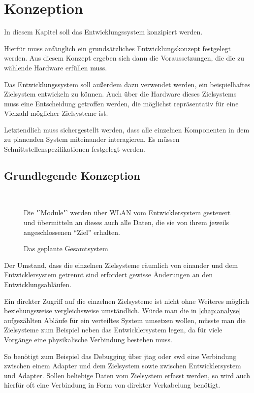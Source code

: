 \chapter{Konzeption}
\minitoc
In diesem Kapitel soll das Entwicklungssystem konzipiert werden.

Hierfür muss anfänglich ein grundsätzliches Entwicklungskonzept festgelegt
werden. Aus diesem Konzept ergeben sich dann die Voraussetzungen, die die zu
wählende Hardware erfüllen muss.

Das Entwicklungssystem soll außerdem dazu verwendet werden, ein
beispielhaftes Zielsystem entwickeln zu können. Auch über die Hardware dieses
Zielsystems muss eine Entscheidung getroffen werden, die möglichst
repräsentativ für eine Vielzahl möglicher Zielsysteme ist.

Letztendlich muss sichergestellt werden, dass alle einzelnen Komponenten in dem
zu planenden System miteinander interagieren. Es müssen
Schnittstellenspezifikationen festgelegt werden.
\section{Grundlegende Konzeption}
\begin{figure}[!ht]
\centering
\def\svgwidth{0.88\columnwidth}
\\
\caption{Das geplante Gesamtsystem}{Die "'Module"' werden über WLAN
vom Entwicklersystem gesteuert und übermitteln an dieses auch alle
Daten, die sie von ihrem jeweils angeschlossenen "`Ziel"' erhalten.}
\label{fig:sys}
\end{figure}
Der Umstand, dass die einzelnen Zielsysteme räumlich von einander und dem
Entwicklersystem getrennt sind erfordert gewisse Änderungen an den
Entwicklungsabläufen.

Ein direkter Zugriff auf die einzelnen Zielsysteme ist nicht ohne Weiteres
möglich beziehungsweise vergleichsweise umständlich. Würde man die in
\autoref{chap:analyse} aufgezählten Abläufe für ein verteiltes System umsetzen
wollen, müsste man die Zielsysteme zum Beispiel neben das Entwicklersystem
legen, da für viele Vorgänge eine physikalische Verbindung bestehen muss.

So benötigt zum Beispiel das Debugging über \gls{jtag} oder \gls{swd} eine
Verbindung zwischen einem Adapter und dem Zielsystem sowie zwischen
Entwicklersystem und Adapter. Sollen beliebige Daten vom Zielsystem erfasst
werden, so wird auch hierfür oft eine Verbindung in Form von direkter
Verkabelung benötigt.

